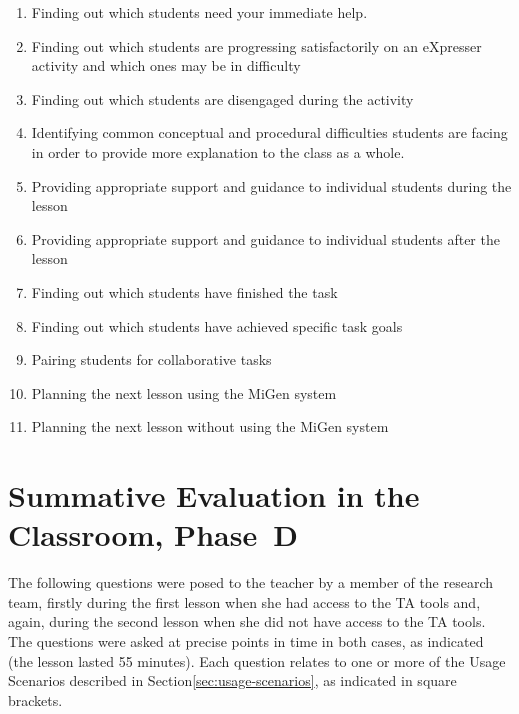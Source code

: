 \begin{enumerate}
\item Finding out which students need your immediate help.
\item Finding out which students are progressing satisfactorily on an
  eXpresser activity and which ones may be in difficulty
\item Finding out which students are disengaged during the activity
\item Identifying common conceptual and procedural difficulties
  students are facing in order to provide more explanation to the
  class as a whole.
\item Providing appropriate support and guidance to individual
  students during the lesson
\item Providing appropriate support and guidance to individual
  students after the lesson
\item Finding out which students have finished the task
\item Finding out which students have achieved specific task goals
\item Pairing students for collaborative tasks
\item Planning the next lesson using the MiGen system
\item Planning the next lesson without using the MiGen system
\end{enumerate}

\section{Summative Evaluation in the Classroom, Phase~D}
\label{sec:summ-eval-classr}

The following questions were posed to the teacher by a member of the
research team, firstly during the first lesson when she had access to
the TA tools and, again, during the second lesson when she did not
have access to the TA tools. The questions were asked at precise
points in time in both cases, as indicated (the lesson lasted 55
minutes). Each question relates to one or more of the Usage Scenarios
described in Section\ref{sec:usage-scenarios}, as indicated in square
brackets.


